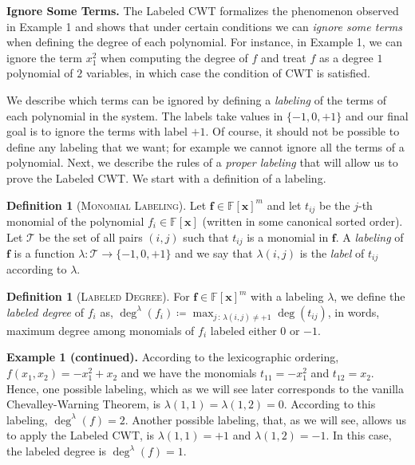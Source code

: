 \documentclass[10pt,a4paper]{article}
\theoremstyle{definition}
\newtheorem{definition}[theorem]{Definition}
\theoremstyle{remark}
\newcommand{\paragr}[1]{\noindent \textbf{\boldmath #1}}
\newcommand{\bbF}{\ensuremath{\mathbb{F}}}
\newcommand{\calT}{\mathcal{T}}
\newcommand{\vecf}{\ensuremath{\boldsymbol{f}}}
\newcommand{\vecx}{\ensuremath{\boldsymbol{x}}}
\newcommand{\CWT}{CWT\xspace}
\begin{document}
\paragr{Ignore Some Terms.} The Labeled \CWT formalizes the phenomenon
observed in Example 1 and shows that under certain conditions we can
\textit{ignore some terms} when defining the degree of each polynomial.
For instance, in Example 1, we can ignore the term
$x_1^2$ when computing the degree of $f$ and treat $f$ as a degree $1$
polynomial of $2$ variables, in which case the condition of \CWT is
satisfied.

We describe which terms can be ignored by defining a \textit{labeling}
of the terms of each polynomial in the system. The labels take values in
$\{-1, 0, +1\}$ and our final goal is to ignore the terms with label
$+1$. Of course, it should not be possible to define any labeling that
we want; for example we cannot ignore all the terms of a polynomial.
Next, we describe the rules of a \textit{proper labeling} that will
allow us to prove the Labeled \CWT. We start with
a definition of a labeling.

\begin{definition}[\textsc{Monomial Labeling}]
  \label{def:monomiallabeling}
     Let $\vecf \in \bbF[\vecx]^m$ and let $t_{i j}$ be the $j$-th monomial of the polynomial $f_i \in \bbF[\vecx]$ (written in some canonical sorted order). Let $\calT$ be the
  set of all pairs $(i, j)$ such that $t_{i j}$ is a monomial in
  $\vecf$. A \textit{labeling} of $\vecf$ is a function
  $\lambda : \calT \to \{-1, 0, +1\}$ and we say that $\lambda(i, j)$
  is the \textit{label} of $t_{i j}$ according to $\lambda$.
\end{definition}

\begin{definition}[\textsc{Labeled Degree}] \label{def:labeledDegree}
    For $\vecf \in \bbF[\vecx]^m$ with a labeling $\lambda$,     we define the \textit{labeled degree} of $f_i$ as,
      $ \deg^{\lambda}(f_i)\coloneqq \max_{j\,:\,\lambda(i, j) \ne +1} \deg(t_{i j})$, in words, maximum degree among monomials of $f_i$ labeled either $0$ or $-1$.
\end{definition}

\paragr{Example 1 (continued).} According to the lexicographic ordering,
$f(x_1, x_2) = - x_1^2 + x_2$ and we have the monomials
$t_{1 1} = - x_1^2$ and $t_{1 2} = x_2$. Hence, one possible labeling,
which as we will see later corresponds to the vanilla Chevalley-Warning
Theorem, is $\lambda(1, 1) = \lambda(1, 2) = 0$. According to this labeling,
$\deg^{\lambda}(f) = 2$. Another possible
labeling, that, as we will see, allows us to apply the Labeled
\CWT\!, is $\lambda(1, 1) = +1$ and $\lambda(1, 2) = -1$.
In this case, the labeled degree is $\deg^{\lambda}(f) = 1$.
\bigskip
\end{document}
